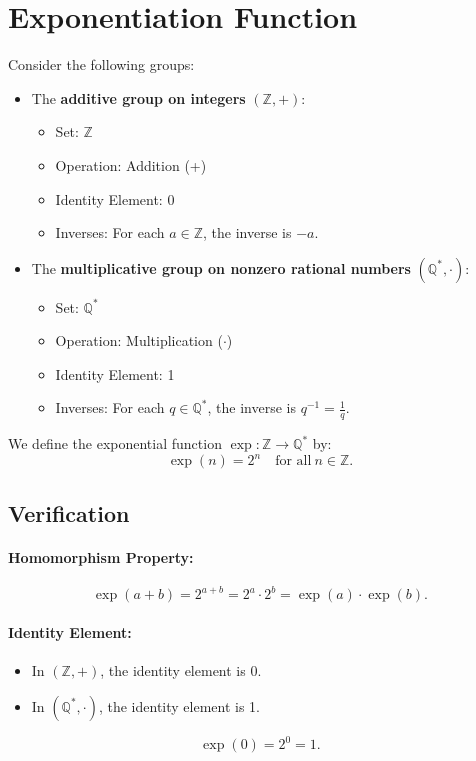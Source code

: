 \section{Exponentiation Function}

Consider the following groups:
\begin{itemize}
	\item The \textbf{additive group on integers} \((\mathbb{Z}, +)\):
	\begin{itemize}
		\item Set: \(\mathbb{Z}\)
		\item Operation: Addition (+)
		\item Identity Element: 0
		\item Inverses: For each \(a \in \mathbb{Z}\), the inverse is \(-a\).
	\end{itemize}
	
	\item The \textbf{multiplicative group on nonzero rational numbers} \((\mathbb{Q}^*, \cdot)\):
	\begin{itemize}
		\item Set: \(\mathbb{Q}^*\)
		\item Operation: Multiplication (\(\cdot\))
		\item Identity Element: 1
		\item Inverses: For each \(q \in \mathbb{Q}^*\), the inverse is \(q^{-1} = \frac{1}{q}\).
	\end{itemize}
\end{itemize}

We define the exponential function \( \exp : \mathbb{Z} \to \mathbb{Q}^* \) by:
\[
\exp(n) = 2^n \quad \text{for all} \ n \in \mathbb{Z}.
\]

\subsection*{Verification}

\paragraph{Homomorphism Property:}
\[
\exp(a + b) = 2^{a + b} = 2^a \cdot 2^b = \exp(a) \cdot \exp(b).
\]

\paragraph{Identity Element:}
\begin{itemize}
	\item In \((\mathbb{Z}, +)\), the identity element is 0.
	\item In \((\mathbb{Q}^*, \cdot)\), the identity element is 1.
\end{itemize}
\[
\exp(0) = 2^0 = 1.
\]

